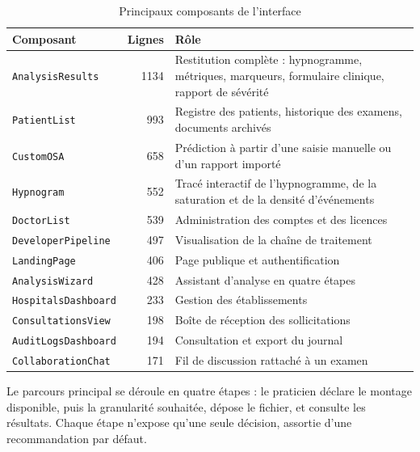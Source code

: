 \begin{table}[H]
\centering

\small
\begin{tabular}{@{}lrL{8.0cm}@{}}
\toprule
\textbf{Composant} & \textbf{Lignes} & \textbf{Rôle} \\
\midrule
\texttt{AnalysisResults} & 1134 & Restitution complète : hypnogramme, métriques,
                                  marqueurs, formulaire clinique, rapport de sévérité \\
\texttt{PatientList}     &  993 & Registre des patients, historique des examens,
                                  documents archivés \\
\texttt{CustomOSA}       &  658 & Prédiction à partir d'une saisie manuelle ou d'un
                                  rapport importé \\
\texttt{Hypnogram}       &  552 & Tracé interactif de l'hypnogramme, de la saturation
                                  et de la densité d'événements \\
\texttt{DoctorList}      &  539 & Administration des comptes et des licences \\
\texttt{DeveloperPipeline} & 497 & Visualisation de la chaîne de traitement \\
\texttt{LandingPage}     &  406 & Page publique et authentification \\
\texttt{AnalysisWizard}  &  428 & Assistant d'analyse en quatre étapes \\
\texttt{HospitalsDashboard} & 233 & Gestion des établissements \\
\texttt{ConsultationsView}  & 198 & Boîte de réception des sollicitations \\
\texttt{AuditLogsDashboard} & 194 & Consultation et export du journal \\
\texttt{CollaborationChat}  & 171 & Fil de discussion rattaché à un examen \\
\bottomrule
\end{tabular}
\caption{Principaux composants de l'interface}
\label{tab:composants}
\end{table}

Le parcours principal se déroule en quatre étapes : le praticien déclare le montage
disponible, puis la granularité souhaitée, dépose le fichier, et consulte les résultats.
Chaque étape n'expose qu'une seule décision, assortie d'une recommandation par défaut.


